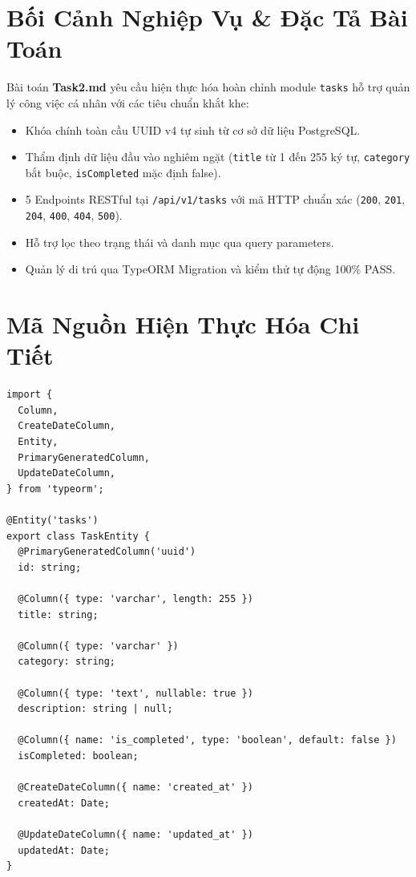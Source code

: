 \documentclass[12pt,a4paper,oneside]{book}
\begin{document}
\section{Bối Cảnh Nghiệp Vụ \& Đặc Tả Bài Toán}
Bài toán \textbf{Task2.md} yêu cầu hiện thực hóa hoàn chỉnh module \texttt{tasks} hỗ trợ quản lý công việc cá nhân với các tiêu chuẩn khắt khe:
\begin{itemize}
  \item Khóa chính toàn cầu UUID v4 tự sinh từ cơ sở dữ liệu PostgreSQL.
  \item Thẩm định dữ liệu đầu vào nghiêm ngặt (\texttt{title} từ 1 đến 255 ký tự, \texttt{category} bắt buộc, \texttt{isCompleted} mặc định false).
  \item 5 Endpoints RESTful tại \texttt{/api/v1/tasks} với mã HTTP chuẩn xác (\texttt{200}, \texttt{201}, \texttt{204}, \texttt{400}, \texttt{404}, \texttt{500}).
  \item Hỗ trợ lọc theo trạng thái và danh mục qua query parameters.
  \item Quản lý di trú qua TypeORM Migration và kiểm thử tự động 100\% PASS.
\end{itemize}

\section{Mã Nguồn Hiện Thực Hóa Chi Tiết}

\begin{codebox}
\begin{Verbatim}[fontsize=\small]
import {
  Column,
  CreateDateColumn,
  Entity,
  PrimaryGeneratedColumn,
  UpdateDateColumn,
} from 'typeorm';

@Entity('tasks')
export class TaskEntity {
  @PrimaryGeneratedColumn('uuid')
  id: string;

  @Column({ type: 'varchar', length: 255 })
  title: string;

  @Column({ type: 'varchar' })
  category: string;

  @Column({ type: 'text', nullable: true })
  description: string | null;

  @Column({ name: 'is_completed', type: 'boolean', default: false })
  isCompleted: boolean;

  @CreateDateColumn({ name: 'created_at' })
  createdAt: Date;

  @UpdateDateColumn({ name: 'updated_at' })
  updatedAt: Date;
}
\end{Verbatim}
\end{codebox}
\end{document}
